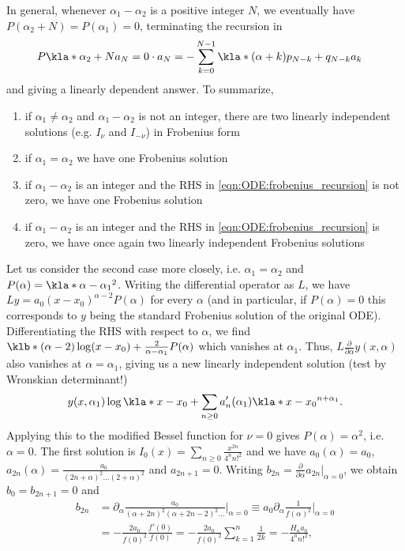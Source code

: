 \documentclass[english, parskip=full]{scrbook}
\begin{document}
In general, whenever $\alpha_1-\alpha_2$ is a positive integer $N$, we eventually have $P(\alpha_2+N)=P(\alpha_1)=0$, terminating the recursion in
\begin{align}
P\kla*{\alpha_2+N}a_N &= 0 \cdot a_N = -\sum_{k=0}^{N-1} \kla*{(\alpha+k)p_{N-k} + q_{N-k}}a_k \label{eqn:ODE:frobenius_recursion}
\end{align}
and giving a linearly dependent answer.
To summarize,
\begin{enumerate}
\item  if $\alpha_1\neq \alpha_2$ and $\alpha_1-\alpha_2$ is not an integer, there are two linearly independent solutions (e.g. $I_\nu$ and $I_{-\nu}$) in Frobenius form
\item if $\alpha_1=\alpha_2$ we have one Frobenius solution
\item if $\alpha_1-\alpha_2$ is an integer and the RHS in \autoref{eqn:ODE:frobenius_recursion} is not zero, we have one Frobenius solution
\item if $\alpha_1-\alpha_2$ is an integer and the RHS in \autoref{eqn:ODE:frobenius_recursion} is zero, we have once again two linearly independent Frobenius solutions
\end{enumerate}
Let us consider the second case more closely, i.e. $\alpha_1=\alpha_2$ and $P(\alpha)=\kla*{\alpha-\alpha_1}^2$.
Writing the differential operator as $L$, we have $Ly = a_0(x-x_0)^{\alpha-2}P(\alpha)$ for every $\alpha$ (and in particular, if $P(\alpha)=0$ this corresponds to $y$ being the standard Frobenius solution of the original ODE).
Differentiating the RHS with respect to $\alpha$, we find $\klb*{(\alpha-2) \log(x-x_0) + \frac{2}{\alpha-\alpha_1}} P(\alpha)$ which vanishes at $\alpha_1$.
Thus, $L\frac{\partial}{\partial \alpha}y(x,\alpha)$ also vanishes at $\alpha=\alpha_1$, giving us a new linearly independent solution (test by Wronskian determinant!)
\begin{align}
y(x,\alpha_1)\log\kla*{x-x_0} + \sum_{n\ge 0} a_n'(\alpha_1) \kla*{x-x_0}^{n+\alpha_1}.
\end{align}
Applying this to the modified Bessel function for $\nu=0$ gives $P(\alpha)=\alpha^2$, i.e. $\alpha=0$.
The first solution is $I_0(x) = \sum_{n\ge 0} \frac{x^{2n}}{4^n n!^2}$ and we have $a_0(\alpha)=a_0$, $a_{2n}(\alpha) = \frac{a_0}{(2n+\alpha)^2 \dots (2+\alpha)^2}$ and $a_{2n+1}=0$.
Writing $b_{2n} = \frac{\partial}{\partial \alpha} a_{2n}\Big\vert_{\alpha=0}$, we obtain $b_0=b_{2n+1}=0$ and
\begin{align}
b_{2n} &= \partial_\alpha \frac{a_0}{(\alpha+2n)^2 (\alpha+2n-2)^2 \dots} \Big\vert_{\alpha=0} \equiv a_0 \partial_\alpha \frac{1}{f(\alpha)^2} \Big\vert_{\alpha=0}\\
&= -\frac{2a_0}{f(0)^2} \frac{f'(0)}{f(0)} = -\frac{2a_0}{f(0)^2} \sum_{k=1}^n \frac{1}{2k} = -\frac{H_na_0}{4^n n!^2},
\end{align}
\end{document}
